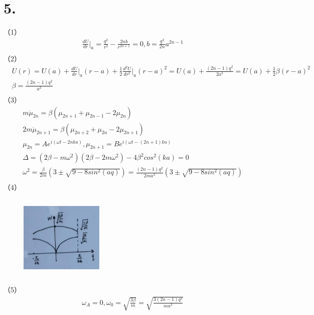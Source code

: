 \documentclass[UTF8]{ctexart}
\begin{document}
\section*{5.}
（1）
\begin{equation*}
    \begin{aligned}
       & \frac{dU}{dr}\bigg\lvert_a=\frac{q^2}{r^2}-\frac{2nb}{r^{2n+1}}=0, b=\frac{q^2}{2n}a^{2n-1}\\ 
    \end{aligned}
\end{equation*}
（2）
\begin{equation*}
    \begin{aligned}
        & U(r) = U(a)+\frac{dU}{dr}\bigg\lvert_a(r-a)+\frac{1}{2}\frac{d^2U}{dr^2}\bigg\lvert_a(r-a)^2 
        = U(a)+\frac{(2n-1)q^2}{2a^3}=U(a)+\frac{1}{2}\beta(r-a)^2\\
        & \beta = \frac{(2n-1)q^2}{a^3}\\
    \end{aligned}
\end{equation*}
（3）
\begin{equation*}
    \begin{aligned}
        & m\ddot\mu_{2n} = \beta(\mu_{2n+1}+\mu_{2n-1}-2\mu_{2n})\\
        & 2m\ddot\mu_{2n+1} = \beta(\mu_{2n+2}+\mu_{2n}-2\mu_{2n+1})\\
        & \mu_{2n} = Ae^{i(\omega t-2nka)}, \mu_{2n+1} = Be^{i(\omega t-(2n+1)ka)}\\
        & \Delta = (2\beta-m\omega^2)(2\beta-2m\omega^2)-4\beta^2cos^2(ka)=0\\
        & \omega^2 = \frac{\beta}{2m}(3\pm\sqrt{9-8sin^2(aq)})=\frac{(2n-1)q^2}{2ma^3}(3\pm\sqrt{9-8sin^2(aq)})\\
    \end{aligned}
\end{equation*}
（4）
\begin{figure}[H]                                        
    \centering                                                
    \includegraphics[width=4cm,height=4cm]{ans-5-5.jpg}        
    \caption*{}                                                                                  
\end{figure}   
（5）
\begin{equation*}
    \begin{aligned}
        &\omega_A=0,\omega_0=\sqrt{\frac{3\beta}{m}}=\sqrt{\frac{3(2n-1)q^2}{ma^3}}\\
    \end{aligned}
\end{equation*}  
\end{document}
